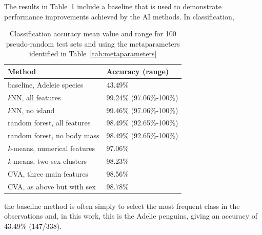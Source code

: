 \documentclass[12pt]{article}
\begin{document}
The results in Table~\ref{tab:results} include a baseline that is used to demonstrate performance improvements 
achieved by the AI methods. In classification, 
\begin{table} %
  \small
  \begin{center}
  \vspace{-3\baselineskip} %
  \setlength{\abovecaptionskip}{5pt}
  \setlength{\belowcaptionskip}{5pt}
  \fontsize{10}{10}\selectfont %
  \begin{tabular}{l|l}
  \textbf{Method} & \textbf{Accuracy (range)}\\
  \hline
  baseline, Adeleie species & 43.49\% \\
  \hline
  \textit{k}NN, all features & 99.24\% (97.06\%-100\%)\\
  \textit{k}NN, no island &	99.46\% (97.06\%-100\%)\\
  \hline
  random forest, all features	& 98.49\% (92.65\%-100\%)\\
  random forest, no body mass & 98.49\% (92.65\%-100\%)\\
  \hline
  \textit{k}-means, numerical features & 97.06\% \\
  \textit{k}-means, two sex clusters  & 98.23\% \\
  \hline
  CVA, three main features & 98.56\% \\
  CVA, as above but with sex & 98.78\% \\
  \hline
  \end{tabular}
  \vspace{-2\baselineskip} %
  \end{center} 
  \caption{\centering\linespread{0.8}\selectfont Classification accuracy mean value and range for 100 pseudo-random test sets 
  and using the metaparameters identified in Table~\ref{tab:metaparameters}}
  \vspace{-0.5\baselineskip} %
  \label{tab:results}
\end{table} 
the baseline method is often simply to select the most frequent class in the observations and, 
in this work, this is the Adelie penguins, giving an accuracy of 43.49\% (147/338).
\end{document}
